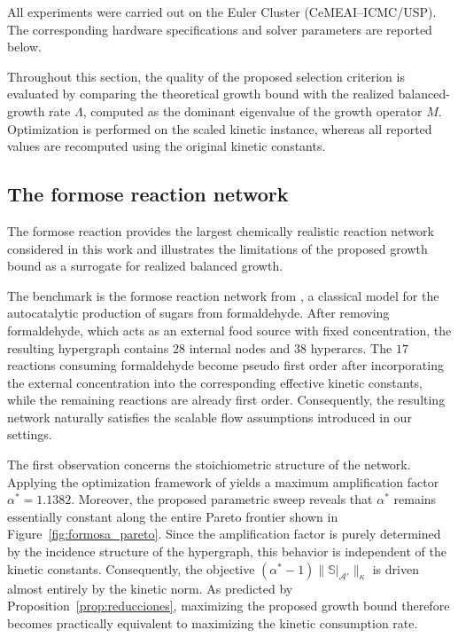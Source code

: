 \documentclass[a4paper,11pt,reqno]{amsart}
\begin{document}
All experiments were carried out on the Euler Cluster (CeMEAI--ICMC/USP). The
corresponding hardware specifications and solver parameters are reported
below.

Throughout this section, the quality of the proposed selection criterion is
evaluated by comparing the theoretical growth bound with the realized
balanced-growth rate $\Lambda$, computed as the dominant eigenvalue of the
growth operator $M$. Optimization is performed on the scaled kinetic instance,
whereas all reported values are recomputed using the original kinetic
constants.



\subsection{The formose reaction network}
\label{sec:formose}

The formose reaction provides the largest chemically realistic reaction
network considered in this work and illustrates the limitations of the
proposed growth bound as a surrogate for realized balanced growth.

The benchmark is the formose reaction network from
\cite{muller2022formose}, a classical model for the autocatalytic production of
sugars from formaldehyde. After removing formaldehyde, which acts as an
external food source with fixed concentration, the resulting hypergraph
contains $28$ internal nodes and $38$ hyperarcs. The $17$ reactions consuming
formaldehyde become pseudo first order after incorporating the external
concentration into the corresponding effective kinetic constants, while the
remaining reactions are already first order. Consequently, the resulting
network naturally satisfies the scalable flow assumptions introduced in our
settings.

The first observation concerns the stoichiometric structure of the network.
Applying the optimization framework of \cite{gonzalez2024maf} yields a maximum
amplification factor $\alpha^*=1.1382$. Moreover, the proposed parametric sweep
reveals that $\alpha^*$ remains essentially constant along the entire Pareto
frontier shown in Figure~\ref{fig:formosa_pareto}. Since the amplification
factor is purely determined by the incidence structure of the hypergraph, this
behavior is independent of the kinetic constants. Consequently, the objective
$(\alpha^*-1)\|\mathbb S|_{\mathcal A'}\|_{\kappa}$ is driven almost entirely by
the kinetic norm. As predicted by Proposition~\ref{prop:reducciones}, maximizing
the proposed growth bound therefore becomes practically equivalent to maximizing
the kinetic consumption rate.
\end{document}
